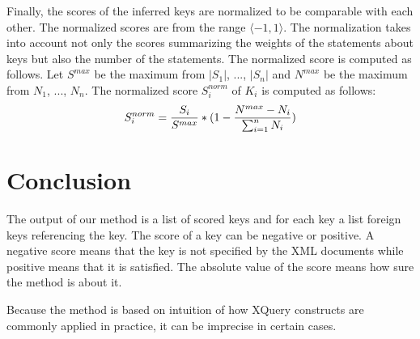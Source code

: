 Finally, the scores of the inferred keys are normalized to be comparable with each other. The normalized scores are from the range $\langle -1, 1\rangle$. The normalization takes into account not only the scores summarizing the weights of the statements about keys but also the number of the statements. The normalized score is computed as follows. Let $S^{max}$ be the maximum from $|S_1|$, ..., $|S_n|$ and $N^{max}$ be the maximum from $N_1$, ..., $N_n$. The normalized score $S_i^{norm}$ of $K_i$ is computed as follows:
$$S_i^{norm} = {S_i \over S^{max}} * (1 - {N^{max} - N_i \over \sum _{i=1}^n N_i})$$

\section{Conclusion}
The output of our method is a list of scored keys and for each key a list foreign keys referencing the key. The score of a key can be negative or positive. A negative score means that the key is not specified by the XML documents while positive means that it is satisfied. The absolute value of the score means how sure the method is about it.

Because the method is based on intuition of how XQuery constructs are commonly applied in practice, it can be imprecise in certain cases.
